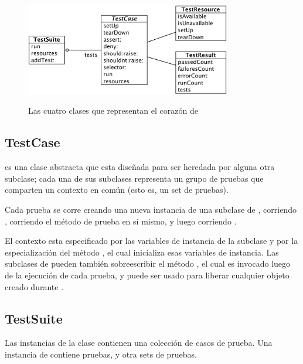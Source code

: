 \documentclass[a4paper,10pt,twoside]{book}
\begin{document}
\begin{figure}[htb]
  \begin{center}
		{\includegraphics[width=0.8\textwidth]{sunit-classes}}
	\caption{Las cuatro clases que representan el coraz\'on de \SUnit}
  \end{center}
\end{figure}


\subsection{TestCase}

 es una clase abstracta que esta dise\~nada para ser heredada por alguna otra subclase;
cada una de sus subclases representa un grupo de pruebas que comparten un contexto en com\'un (esto es, un set de pruebas).

Cada prueba se corre creando una nueva instancia de una subclase de ,
corriendo , corriendo el m\'etodo de prueba en s\'i mismo, y luego
corriendo .


El contexto esta especificado por las variables de instancia de la subclase y por la 
especializaci\'on del m\'etodo , el cual inicializa esas variables
de instancia. Las subclases de  pueden tambi\'en sobreescribir el m\'etodo
, el cual es invocado luego de la ejecuci\'on de cada prueba, y puede ser usado para
liberar cualquier objeto creado durante .


\subsection{TestSuite}

Las instancias de la clase  contienen una colecci\'on de casos de prueba.
Una instancia de  contiene pruebas, y otra sets de pruebas.
\end{document}
